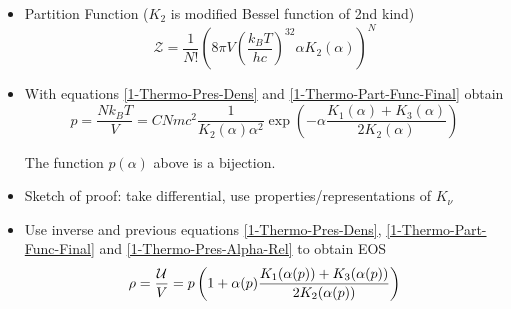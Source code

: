 \begin{frame}
	\begin{itemize}%
		\item Partition Function ($K_2$ is modified Bessel function of 2nd kind)
		\begin{equation}
			\mathcal{Z} = \frac{1}{N!}\left(8\pi V\left(\frac{k_BT}{hc}\right)^32\alpha K_2(\alpha)\right)^N
			\label{1-Thermo-Part-Func-Final}
		\end{equation}
		\item With equations \ref{1-Thermo-Pres-Dens} and \ref{1-Thermo-Part-Func-Final} obtain
		\begin{equation}
			p = \frac{Nk_BT}{V} = CNmc^2\frac{1}{K_2(\alpha)\alpha^2}\exp\left(-\alpha\frac{K_1(\alpha)+K_3(\alpha)}{2K_2(\alpha)}\right)
			\label{1-Thermo-Pres-Alpha-Rel}
		\end{equation}
		\begin{theorem}
			The function $p(\alpha)$ above is a bijection.
		\end{theorem}
		\item Sketch of proof: take differential, use properties/representations of $K_\nu$
		\item Use inverse and previous equations \ref{1-Thermo-Pres-Dens}, \ref{1-Thermo-Part-Func-Final} and \ref{1-Thermo-Pres-Alpha-Rel} to obtain EOS
		\begin{equation}
			\rho = \frac{\mathcal{U}}{V} = p\left(1+\alpha(p)\frac{K_1(\alpha(p))+K_3(\alpha(p))}{2K_2(\alpha(p))}\right)
		\end{equation}
	\end{itemize}
\end{frame}



